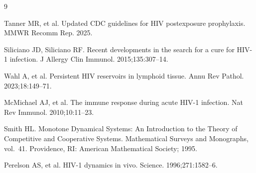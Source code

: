 \documentclass[12pt,a4paper]{article}
\theoremstyle{plain}
\theoremstyle{definition}
\theoremstyle{remark}
\begin{document}
\begin{thebibliography}{9}

Tanner MR, et al. Updated CDC guidelines for HIV postexposure prophylaxis. MMWR Recomm Rep. 2025.

Siliciano JD, Siliciano RF. Recent developments in the search for a cure for HIV-1 infection. J Allergy Clin Immunol. 2015;135:307--14.

Wahl A, et al. Persistent HIV reservoirs in lymphoid tissue. Annu Rev Pathol. 2023;18:149--71.

McMichael AJ, et al. The immune response during acute HIV-1 infection. Nat Rev Immunol. 2010;10:11--23.

Smith HL. Monotone Dynamical Systems: An Introduction to the Theory of Competitive and Cooperative Systems. Mathematical Surveys and Monographs, vol.~41. Providence, RI: American Mathematical Society; 1995.

Perelson AS, et al. HIV-1 dynamics in vivo. Science. 1996;271:1582--6.

\end{thebibliography}
\end{document}

